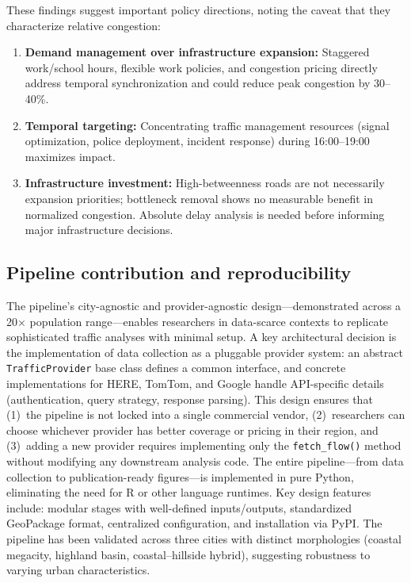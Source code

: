 \documentclass[preprint,12pt,authoryear]{elsarticle}
\begin{document}
These findings suggest important policy directions, noting the caveat that they characterize relative congestion:

\begin{enumerate}
\item \textbf{Demand management over infrastructure expansion:} Staggered work/school hours, flexible work policies, and congestion pricing directly address temporal synchronization and could reduce peak congestion by 30--40\%.
\item \textbf{Temporal targeting:} Concentrating traffic management resources (signal optimization, police deployment, incident response) during 16:00--19:00 maximizes impact.
\item \textbf{Infrastructure investment:} High-betweenness roads are not necessarily expansion priorities; bottleneck removal shows no measurable benefit in normalized congestion. Absolute delay analysis is needed before informing major infrastructure decisions.
\end{enumerate}

\subsection{Pipeline contribution and reproducibility}

The pipeline's city-agnostic and provider-agnostic design---demonstrated across a 20$\times$ population range---enables researchers in data-scarce contexts to replicate sophisticated traffic analyses with minimal setup. A key architectural decision is the implementation of data collection as a pluggable provider system: an abstract \texttt{TrafficProvider} base class defines a common interface, and concrete implementations for HERE, TomTom, and Google handle API-specific details (authentication, query strategy, response parsing). This design ensures that (1)~the pipeline is not locked into a single commercial vendor, (2)~researchers can choose whichever provider has better coverage or pricing in their region, and (3)~adding a new provider requires implementing only the \texttt{fetch\_flow()} method without modifying any downstream analysis code. The entire pipeline---from data collection to publication-ready figures---is implemented in pure Python, eliminating the need for R or other language runtimes. Key design features include: modular stages with well-defined inputs/outputs, standardized GeoPackage format, centralized configuration, and installation via PyPI. The pipeline has been validated across three cities with distinct morphologies (coastal megacity, highland basin, coastal--hillside hybrid), suggesting robustness to varying urban characteristics.
\end{document}
